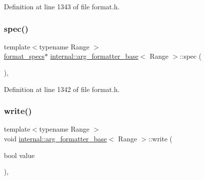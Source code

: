 Definition at line 1343 of file format.\+h.

\mbox{\label{classinternal_1_1arg__formatter__base_aee5efc224d29ce5352d856cbb9afeffa}} 
\subsubsection{\texorpdfstring{spec()}{spec()}}
{\footnotesize\ttfamily template$<$typename Range $>$ \\
\hyperlink{classinternal_1_1arg__formatter__base_acff46f7da1afa536210eb77a2ea0d775}{format\+\_\+specs}$\ast$ \hyperlink{classinternal_1_1arg__formatter__base}{internal\+::arg\+\_\+formatter\+\_\+base}$<$ Range $>$\+::spec (\begin{DoxyParamCaption}{ }\end{DoxyParamCaption})\hspace{0.3cm}{\ttfamily [inline]}, {\ttfamily [protected]}}



Definition at line 1342 of file format.\+h.

\mbox{\label{classinternal_1_1arg__formatter__base_afec2f8db2cc820b66ae5065737cbda8a}} 
\subsubsection{\texorpdfstring{write()}{write()}\hspace{0.1cm}{\footnotesize\ttfamily [1/2]}}
{\footnotesize\ttfamily template$<$typename Range $>$ \\
void \hyperlink{classinternal_1_1arg__formatter__base}{internal\+::arg\+\_\+formatter\+\_\+base}$<$ Range $>$\+::write (\begin{DoxyParamCaption}\item[{bool}]{value }\end{DoxyParamCaption})\hspace{0.3cm}{\ttfamily [inline]}, {\ttfamily [protected]}}



